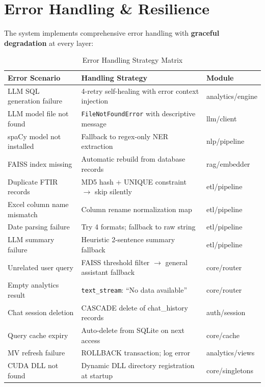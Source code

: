 \documentclass[12pt, a4paper, twoside]{article}
\begin{document}
\newpage

\section{Error Handling \& Resilience}

The system implements comprehensive error handling with \textbf{graceful degradation} at every layer:

\begin{table}[H]
\centering
\caption{Error Handling Strategy Matrix}
\label{tab:errors}
\begin{tabularx}{\textwidth}{L{3cm} X L{2.5cm}}
\toprule
{}\color{white}\textbf{Error Scenario} & \color{white}\textbf{Handling Strategy} & \color{white}\textbf{Module} \\
\midrule
LLM SQL generation failure & 4-retry self-healing with error context injection & analytics/engine \\
LLM model file not found & \texttt{FileNotFoundError} with descriptive message & llm/client \\
spaCy model not installed & Fallback to regex-only NER extraction & nlp/pipeline \\
FAISS index missing & Automatic rebuild from database records & rag/embedder \\
Duplicate FTIR records & MD5 hash + UNIQUE constraint $\rightarrow$ skip silently & etl/pipeline \\
Excel column name mismatch & Column rename normalization map & etl/pipeline \\
Date parsing failure & Try 4 formats; fallback to raw string & etl/pipeline \\
LLM summary failure & Heuristic 2-sentence summary fallback & etl/pipeline \\
Unrelated user query & FAISS threshold filter $\rightarrow$ general assistant fallback & core/router \\
Empty analytics result & \texttt{text\_stream}: ``No data available'' & core/router \\
Chat session deletion & CASCADE delete of chat\_history records & auth/session \\
Query cache expiry & Auto-delete from SQLite on next access & core/cache \\
MV refresh failure & ROLLBACK transaction; log error & analytics/views \\
CUDA DLL not found & Dynamic DLL directory registration at startup & core/singletons \\
\bottomrule
\end{tabularx}
\end{table}
\end{document}
